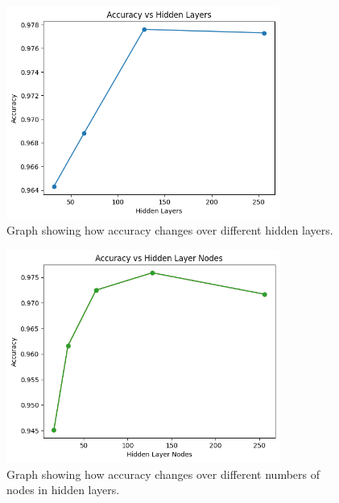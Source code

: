 \documentclass[a4paper,11pt]{article}
\theoremstyle{plain} %
\theoremstyle{definition} %
\theoremstyle{remark} %
\begin{document}
\begin{figure}[h]
	\centering 
	\includegraphics[width=0.8\textwidth, angle=0]{layers.png}	
	\caption{Graph showing how accuracy changes over different hidden layers.} 
	\label{layers}%
\end{figure}

\begin{figure}[h]
	\centering 
	\includegraphics[width=0.8\textwidth, angle=0]{nodes.png}	
	\caption{Graph showing how accuracy changes over different numbers of nodes in hidden layers.} 
	\label{nodes}%
\end{figure}

\clearpage


\end{document}
